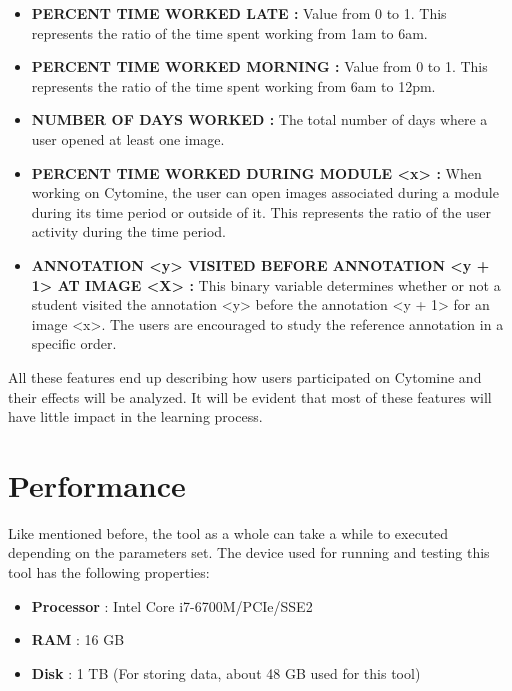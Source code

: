 \documentclass[a4paper,11pt]{report}
\numberwithin{figure}{chapter} %
\begin{document}
\begin{itemize}
    \item[\textbullet] \textbf{PERCENT TIME WORKED LATE :} Value from 0 to 1.
    This represents the ratio of the time spent working from 1am to 6am.

    \item[\textbullet] \textbf{PERCENT TIME WORKED MORNING :} Value from 0 to 1.
    This represents the ratio of the time spent working from 6am to 12pm.

    \item[\textbullet] \textbf{NUMBER OF DAYS WORKED :} The total number of days where a user opened at least one image.

    \item[\textbullet] \textbf{PERCENT TIME WORKED DURING MODULE <x> :} When working on Cytomine, the user can open images associated during a module during its time period or outside of it.
    This represents the ratio of the user activity during the time period.

	\item[\textbullet] \textbf{ANNOTATION <y> VISITED BEFORE ANNOTATION <y + 1> AT IMAGE <X> :} This binary variable determines whether or not a student visited the annotation <y> before the annotation <y + 1> for an image <x>.
	The users are encouraged to study the reference annotation in a specific order.

    \end{itemize}


    All these features end up describing how users participated on Cytomine and their effects will be analyzed.
    It will be evident that most of these features will have little impact in the learning process.



    \section{Performance}

    Like mentioned before, the tool as a whole can take a while to executed depending on the parameters set.
    The device used for running and testing this tool has the following properties:
    \begin{itemize}
        \item[\textbullet] \textbf{Processor} : Intel Core i7-6700M/PCIe/SSE2
        \item[\textbullet] \textbf{RAM} : 16 GB
        \item[\textbullet] \textbf{Disk} : 1 TB (For storing data, about 48 GB used for this tool)
    \end{itemize}
\end{document}
